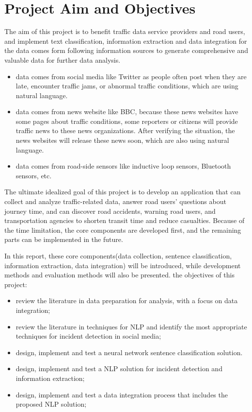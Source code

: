 \section{Project Aim and Objectives }
\qquad The aim of this project is to benefit traffic data service providers and road users, and implement text classification, information extraction and data integration for the data comes form following information sources to generate comprehensive and valuable data for further data analysis.
\begin{itemize} %
\item data comes from social media like Twitter  as people often post when they are late, encounter traffic jams, or abnormal traffic conditions, which are using natural language.
\item data comes from news website like BBC, because these news websites have some pages about traffic conditions, some reporters or citizens will provide traffic news to these news organizations. After verifying the situation, the news websites will release these news soon, which are also using natural language.
\item data comes from road-side sensors like inductive loop sensors, Bluetooth sensors, etc.
\end{itemize}

The ultimate idealized goal of this project is to develop an application that can collect and analyze traffic-related data, answer road users' questions about journey time, and can discover road accidents, warning road users, and transportation agencies to shorten transit time and reduce casualties. Because of the time limitation, the core components are developed first, and the remaining parts can be implemented in the future.

In this report, these core components(data collection, sentence classification, information extraction, data integration) will be introduced, while development methods and evaluation methods will also be presented.
the objectives of this project:
\begin{itemize}
\item review the literature in data preparation for analysis, with a focus on data integration;
\item review the literature in techniques for NLP and identify the most appropriate techniques for incident detection in social media;
\item design, implement and test a neural network sentence classification solution. 
\item design, implement and test a NLP solution for incident detection and information extraction; 
\item design, implement and test a data integration process that includes the proposed NLP solution;
\end{itemize}
